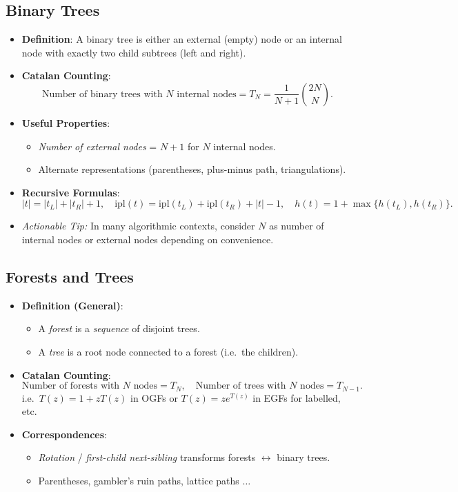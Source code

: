 \documentclass[11pt,letterpaper]{article}
\begin{document}
\subsection{Binary Trees}
\begin{itemize}
  \item \textbf{Definition}: A binary tree is either an external (empty) node or an internal node with exactly two child subtrees (left and right).
  \item \textbf{Catalan Counting}:
    \[
      \text{Number of binary trees with }N\text{ internal nodes} = 
      T_N = \frac{1}{N+1}\binom{2N}{N}.
    \]
  \item \textbf{Useful Properties}:
    \begin{itemize}
      \item \emph{Number of external nodes} = $N+1$ for $N$ internal nodes.
      \item Alternate representations (parentheses, plus-minus path, triangulations).
    \end{itemize}
  \item \textbf{Recursive Formulas}:
    \[
      |t| = |t_L| + |t_R| + 1,\quad
      \mathrm{ipl}(t)=\mathrm{ipl}(t_L)+\mathrm{ipl}(t_R)+|t| - 1,\quad
      h(t)=1+\max\{h(t_L),h(t_R)\}.
    \]
  \item \emph{Actionable Tip:} In many algorithmic contexts, consider $N$ as number of internal nodes or external nodes depending on convenience.
\end{itemize}

\subsection{Forests and Trees}
\begin{itemize}
  \item \textbf{Definition (General)}:
    \begin{itemize}
      \item A \emph{forest} is a \emph{sequence} of disjoint trees.
      \item A \emph{tree} is a root node connected to a forest (i.e.\ the children).
    \end{itemize}
  \item \textbf{Catalan Counting}:
    \[
      \text{Number of forests with }N\text{ nodes} = T_N,\quad
      \text{Number of trees with }N\text{ nodes} = T_{N-1}.
    \]
    i.e.\ $T(z) = 1 + zT(z)$ in OGFs or $T(z)=ze^{T(z)}$ in EGFs for labelled, etc.
  \item \textbf{Correspondences}: 
    \begin{itemize}
      \item \textit{Rotation} / \textit{first-child next-sibling} transforms forests $\leftrightarrow$ binary trees.
      \item Parentheses, gambler's ruin paths, lattice paths $\ldots$
    \end{itemize}
\end{itemize}
\end{document}
